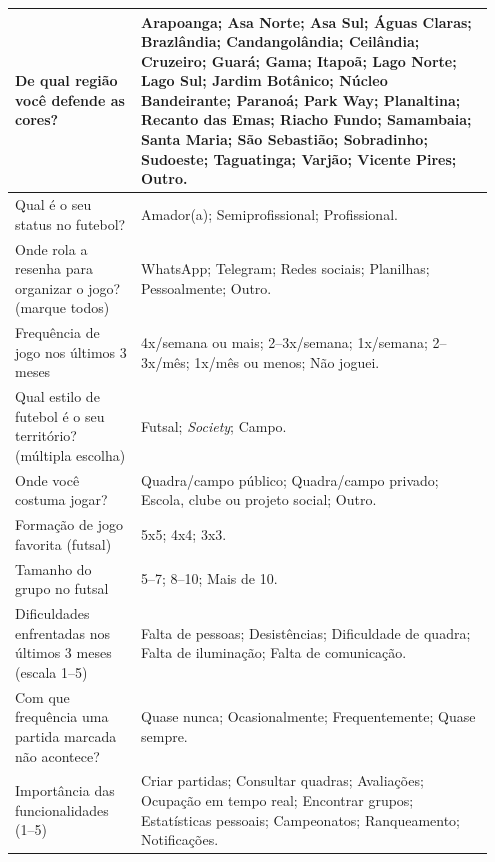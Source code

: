 \begin{apendicesenv}
\begin{longtable}{p{0.25\linewidth} p{0.70\linewidth}}
        De qual região você defende as cores? &
        Arapoanga; Asa Norte; Asa Sul; Águas Claras; Brazlândia; Candangolândia; Ceilândia; Cruzeiro; Guará; Gama; Itapoã; Lago Norte; Lago Sul; Jardim Botânico; Núcleo Bandeirante; Paranoá; Park Way; Planaltina; Recanto das Emas; Riacho Fundo; Samambaia; Santa Maria; São Sebastião; Sobradinho; Sudoeste; Taguatinga; Varjão; Vicente Pires; Outro. \\
        \hline

        Qual é o seu status no futebol? &
        Amador(a); Semiprofissional; Profissional. \\
        \hline

        Onde rola a resenha para organizar o jogo? (marque todos) &
        WhatsApp; Telegram; Redes sociais; Planilhas; Pessoalmente; Outro. \\
        \hline

        Frequência de jogo nos últimos 3 meses &
        4x/semana ou mais; 2–3x/semana; 1x/semana; 2–3x/mês; 1x/mês ou menos; Não joguei. \\
        \hline

        Qual estilo de futebol é o seu território? (múltipla escolha) &
        Futsal; \textit{Society}; Campo. \\
        \hline

        Onde você costuma jogar? &
        Quadra/campo público; Quadra/campo privado; Escola, clube ou projeto social; Outro. \\
        \hline

        Formação de jogo favorita (futsal) &
        5x5; 4x4; 3x3. \\
        \hline

        Tamanho do grupo no futsal &
        5–7; 8–10; Mais de 10. \\
        \hline

        Dificuldades enfrentadas nos últimos 3 meses (escala 1–5) &
        Falta de pessoas; Desistências; Dificuldade de quadra; Falta de iluminação; Falta de comunicação. \\
        \hline

        Com que frequência uma partida marcada não acontece? &
        Quase nunca; Ocasionalmente; Frequentemente; Quase sempre. \\
        \hline

        Importância das funcionalidades (1–5) &
        Criar partidas; Consultar quadras; Avaliações; Ocupação em tempo real; Encontrar grupos; Estatísticas pessoais; Campeonatos; Ranqueamento; Notificações. \\
        \hline


\end{longtable}
\end{apendicesenv}
